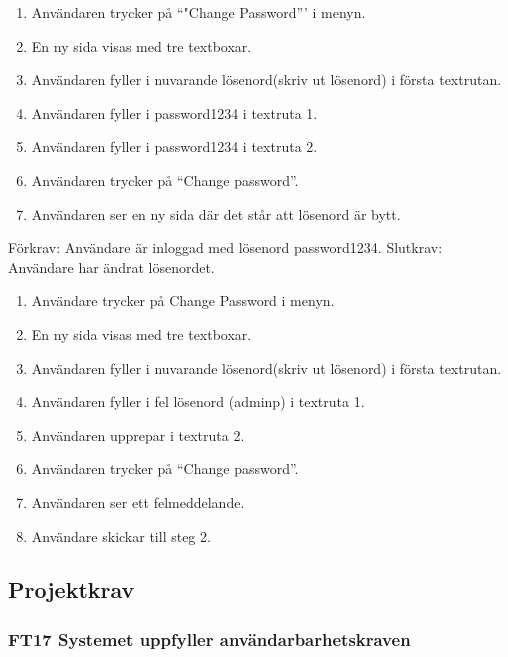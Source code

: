 \documentclass[paper=a4, fontsize=11pt,twoside]{article}
\begin{document}
		\begin{enumerate}
		  	\item Användaren trycker på ``"Change Password''' i menyn.
			\item En ny sida visas med tre textboxar.
			\item Användaren fyller i nuvarande lösenord(skriv ut lösenord) i första
			textrutan.
			\item Användaren fyller i password1234 i textruta 1.
			\item Användaren fyller i password1234 i textruta 2. 
			\item Användaren trycker på “Change password”.
			\item Användaren ser en ny sida där det står att lösenord är bytt.
		  
		\end{enumerate}
		
		
		
		Förkrav: Användare är inloggad med lösenord password1234.
		\newline 
		Slutkrav: Användare har ändrat lösenordet.
		
		\begin{enumerate}
		\item Användare trycker på Change Password i menyn.
		\item	En ny sida visas med tre textboxar.
		\item	Användaren fyller i nuvarande lösenord(skriv ut lösenord) i första
		textrutan.
		\item Användaren fyller i fel lösenord (adminp) i textruta 1.
		\item	Användaren upprepar i textruta 2.
		\item	Användaren trycker på “Change password”.
		\item	Användaren ser ett felmeddelande.
		\item	Användare skickar till steg 2.
		  
		\end{enumerate}
		
		\subsection{Projektkrav}
		
		\subsubsection*{FT17 Systemet uppfyller användarbarhetskraven}
		
\end{document}
